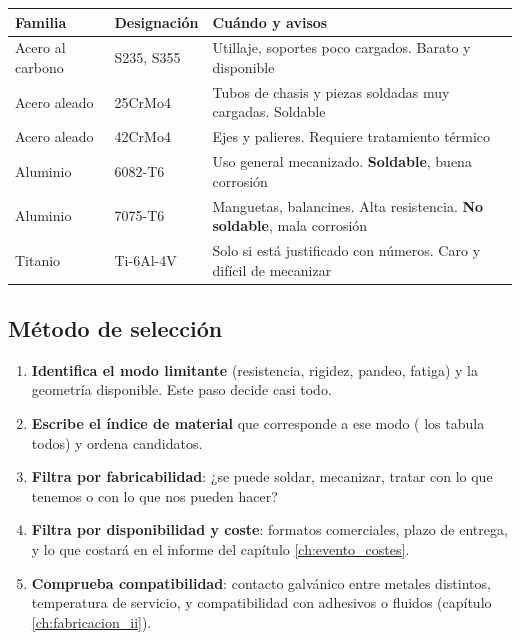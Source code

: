 \begin{center}
\begin{tabularx}{\textwidth}{@{}llX@{}}
\toprule
\textbf{Familia} & \textbf{Designación} & \textbf{Cuándo y avisos} \\
\midrule
Acero al carbono & S235, S355 & Utillaje, soportes poco cargados. Barato y disponible \\
Acero aleado & 25CrMo4 & Tubos de chasis y piezas soldadas muy cargadas. Soldable \\
Acero aleado & 42CrMo4 & Ejes y palieres. Requiere tratamiento térmico \\
Aluminio & 6082-T6 & Uso general mecanizado. \textbf{Soldable}, buena corrosión \\
Aluminio & 7075-T6 & Manguetas, balancines. Alta resistencia. \textbf{No soldable}, mala corrosión \\
Titanio & Ti-6Al-4V & Solo si está justificado con números. Caro y difícil de mecanizar \\
\bottomrule
\end{tabularx}
\end{center}


\subsection{Método de selección}

\begin{enumerate}
  \item \textbf{Identifica el modo limitante} (resistencia, rigidez, pandeo,
        fatiga) y la geometría disponible. Este paso decide casi todo.
  \item \textbf{Escribe el índice de material} que corresponde a ese modo
        (\textcite{ashby_materials_2016} los tabula todos) y ordena candidatos.
  \item \textbf{Filtra por fabricabilidad}: ¿se puede soldar, mecanizar, tratar
        con lo que tenemos o con lo que nos pueden hacer?
  \item \textbf{Filtra por disponibilidad y coste}: formatos comerciales, plazo de
        entrega, y lo que costará en el informe del capítulo
        \ref{ch:evento_costes}.
  \item \textbf{Comprueba compatibilidad}: contacto galvánico entre metales
        distintos, temperatura de servicio, y compatibilidad con adhesivos o
        fluidos (capítulo \ref{ch:fabricacion_ii}).
\end{enumerate}

